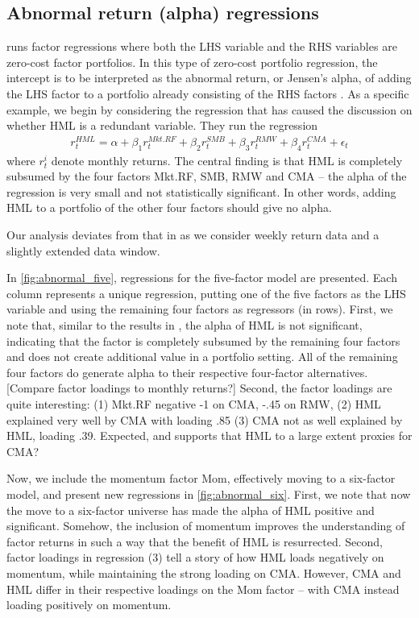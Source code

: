 \subsection{Abnormal return (alpha) regressions}
\label{subsec:alpha_reg}
\textcite{FF2015} runs factor regressions where both the LHS variable and the RHS variables are zero-cost factor portfolios. In this type of zero-cost portfolio regression, the intercept is to be interpreted as the abnormal return, or Jensen's alpha, of adding the LHS factor to a portfolio already consisting of the RHS factors \autocite{Jensen1968}. As a specific example, we begin by considering the regression that has caused the discussion on whether HML is a redundant variable. They run the regression
\begin{align}
  r^{HML}_t = \alpha + \beta_1 r^{Mkt.RF}_t + \beta_2 r^{SMB}_t + \beta_3 r^{RMW}_t + \beta_4 r^{CMA}_t + \epsilon_t
\end{align}
where $r^i_t$ denote monthly returns. The central finding is that HML is completely subsumed by the four factors Mkt.RF, SMB, RMW and CMA -- the alpha of the regression is very small and not statistically significant. In other words, adding HML to a portfolio of the other four factors should give no alpha.

Our analysis deviates from that in \textcite{FF2015} as we consider weekly return data and a slightly extended data window.

In \autoref{fig:abnormal_five}, regressions for the five-factor model are presented. Each column represents a unique regression, putting one of the five factors as the LHS variable and using the remaining four factors as regressors (in rows). First, we note that, similar to the results in \textcite{FF2015}, the alpha of HML is not significant, indicating that the factor is completely subsumed by the remaining four factors and does not create additional value in a portfolio setting. All of the remaining four factors do generate alpha to their respective four-factor alternatives. [Compare factor loadings to monthly returns?] Second, the factor loadings are quite interesting: (1) Mkt.RF negative -1 on CMA, -.45 on RMW, (2) HML explained very well by CMA with loading .85 (3) CMA not as well explained by HML, loading .39. Expected, and supports that HML to a large extent proxies for CMA?

Now, we include the momentum factor Mom, effectively moving to a six-factor model, and present new regressions in \autoref{fig:abnormal_six}. First, we note that now the move to a six-factor universe has made the alpha of HML positive and significant. Somehow, the inclusion of momentum improves the understanding of factor returns in such a way that the benefit of HML is resurrected. Second, factor loadings in regression (3) tell a story of how HML loads negatively on momentum, while maintaining the strong loading on CMA. However, CMA and HML differ in their respective loadings on the Mom factor -- with CMA instead loading positively on momentum.

